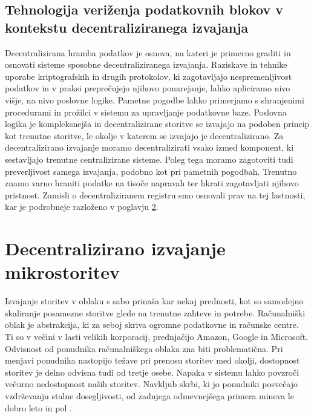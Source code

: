 \documentclass[a4paper, 12pt]{book}
\begin{document}
\section{Tehnologija veriženja podatkovnih blokov v kontekstu decentraliziranega izvajanja}
Decentralizirana hramba podatkov je osnova, na kateri je primerno graditi in osnovati sisteme sposobne decentraliziranega izvajanja.
Raziskave in tehnike uporabe kriptografskih in drugih protokolov, ki zagotavljajo nespremenljivost podatkov in v praksi preprečujejo njihovo ponarejanje, lahko apliciramo nivo višje, na nivo poslovne logike.
Pametne pogodbe lahko primerjamo s shranjenimi procedurami in prožilci v sistemu za upravljanje podatkovne baze.
Poslovna logika je kompleksnejša in decentralizirane storitve se izvajajo na podoben princip kot trenutne storitve, le okolje v katerem se izvajajo je decentralizirano.
Za decentralizirano izvajanje moramo decentralizirati vsako izmed komponent, ki sestavljajo trenutne centralizirane sisteme.
Poleg tega moramo zagotoviti tudi preverljivost samega izvajanja, podobno kot pri pametnih pogodbah.
Trenutno znamo varno hraniti podatke na tisoče napravah ter hkrati zagotavljati njihovo pristnost.
Zamisli o decentraliziranem registru smo osnovali prav na tej lastnosti, kar je podrobneje razloženo v poglavju \ref{ch4}.

\chapter{Decentralizirano izvajanje mikrostoritev}
\label{ch4}

Izvajanje storitev v oblaku s sabo prinaša kar nekaj prednosti, kot so samodejno skaliranje posamezne storitve glede na trenutne zahteve in potrebe.
Računalniški oblak je abstrakcija, ki za seboj skriva ogromne podatkovne in računske centre.
Ti so v večini v lasti velikih korporacij, prednjačijo Amazon, Google in Microsoft.
Odvisnost od ponudnika računalniškega oblaka zna biti problematična.
Pri menjavi ponudnika nastopijo težave pri prenosu storitev med okolji, dostopnost storitev je delno odvisna tudi od tretje osebe. 
Napaka v sistemu lahko povzroči večurno nedostopnost naših storitev.
Navkljub skrbi, ki jo ponudniki posvečajo vzdrževanju stalne dosegljivosti, od zadnjega odmevnejšega primera mineva le dobro leto in pol \cite{awsFail}.
\end{document}

